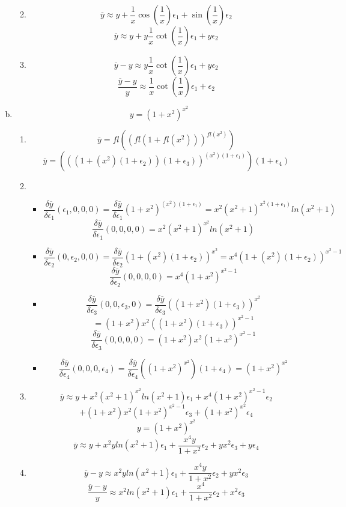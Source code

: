 \documentclass[12pt,a4paper]{article}
\begin{document}
\begin{enumerate}[(a)]
\begin{enumerate}[1.]
\begin{itemize}
\end{itemize}
\item
\[
\overline{y} \approx y +
\frac{1}{x}\cos\left(\frac{1}{x}\right) \epsilon_1
+
\sin\left(\frac{1}{x}\right) \epsilon_2
\]
\[
\overline{y} \approx y +
y \frac{1}{x}\cot\left(\frac{1}{x}\right)\epsilon_1
+
y \epsilon_2
\]
\item
\[
\overline{y} - y \approx 
y \frac{1}{x}\cot\left(\frac{1}{x}\right)\epsilon_1
+
y \epsilon_2
\]
\[
\frac{\overline{y}-y}{y} \approx 
\frac{1}{x}\cot\left(\frac{1}{x}\right)\epsilon_1
+
\epsilon_2
\]
\end{enumerate}

\item
\[
y= (1+x^2)^{x^{2}}
\]
\begin{enumerate}[1.]
\item
\[
\overline{y} = fl \left( \left(fl(1+fl(x^2))\right)^{fl(x^{2})} \right)
\]
\[
\overline{y} = \left( \left((1+(x^2)(1+\epsilon_2))(1+\epsilon_3)\right)^{(x^{2})(1+\epsilon_1)} \right)(1+\epsilon_4)
\]
\item
\begin{itemize}
\item
\[
\frac{\delta\overline{y}}{\delta\epsilon_1}(\epsilon_1,0,0,0)
= \frac{\delta\overline{y}}{\delta\epsilon_1}
(1+x^2)^{(x^{2})(1+\epsilon_1)}
= x^2(x^2+1)^{x^2(1+\epsilon_1)}ln(x^2+1)
\]
\[
\frac{\delta\overline{y}}{\delta\epsilon_1}(0,0,0,0)
= x^2(x^2+1)^{x^2}ln(x^2+1)
\]
\item
\[
\frac{\delta\overline{y}}{\delta\epsilon_2}(0,\epsilon_2,0,0)
= \frac{\delta\overline{y}}{\delta\epsilon_2}
(1+(x^2)(1+\epsilon_2))^{x^{2}}
= x^4(1+(x^2)(1+\epsilon_2))^{x^{2}-1}
\]
\[
\frac{\delta\overline{y}}{\delta\epsilon_2}(0,0,0,0)
= x^4(1+x^2)^{x^{2}-1}
\]
\item
\[
\frac{\delta\overline{y}}{\delta\epsilon_3}(0,0,\epsilon_3,0)
= \frac{\delta\overline{y}}{\delta\epsilon_3}
((1+x^2)(1+\epsilon_3))^{x^{2}}
\]
\[
= (1+x^2)x^2((1+x^2)(1+\epsilon_3))^{x^{2}-1}
\]
\[
\frac{\delta\overline{y}}{\delta\epsilon_3}(0,0,0,0)
= (1+x^2)x^2(1+x^2)^{x^{2}-1}
\]

\item
\[
\frac{\delta\overline{y}}{\delta\epsilon_4}(0,0,0,\epsilon_4)
= \frac{\delta\overline{y}}{\delta\epsilon_4}
\left((1+x^2)^{x^{2}}\right)(1+\epsilon_4)
= (1+x^2)^{x^{2}}
\]
\end{itemize}
\item
\[
\overline{y} \approx y +
x^2(x^2+1)^{x^2}ln(x^2+1) \epsilon_1
+
x^4(1+x^2)^{x^{2}-1} \epsilon_2
\]
\[
+
(1+x^2)x^2(1+x^2)^{x^{2}-1} \epsilon_3
+
(1+x^2)^{x^{2}} \epsilon_4
\]
\[
y= (1+x^2)^{x^{2}}
\]
\[
\overline{y} \approx y +
x^2yln(x^2+1) \epsilon_1
+
\frac{x^4y}{1+x^2} \epsilon_2
+
yx^2 \epsilon_3
+
y \epsilon_4
\]
\item
\[
\overline{y} - y \approx 
x^2yln(x^2+1) \epsilon_1
+
\frac{x^4y}{1+x^2} \epsilon_2
+
yx^2 \epsilon_3
\]
\[
\frac{\overline{y}-y}{y} \approx 
x^2ln(x^2+1) \epsilon_1
+
\frac{x^4}{1+x^2} \epsilon_2
+
x^2 \epsilon_3
\]
\end{enumerate}


\end{enumerate}
\end{document}
